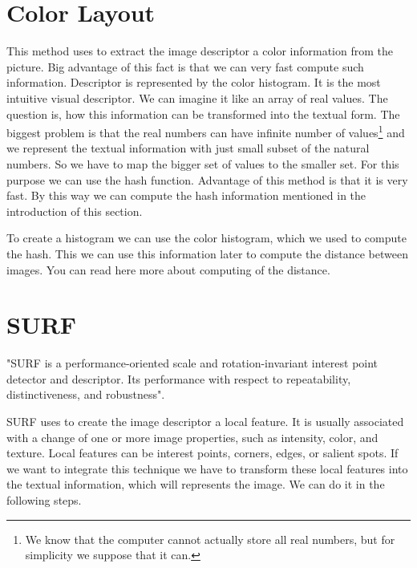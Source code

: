 \documentclass[12pt,a4paper]{report}
\begin{document}
\section{Color Layout}

This method uses to extract the image descriptor a color information from the picture. Big advantage of this fact is that we can very fast compute such information. Descriptor is represented by the color histogram. It is the most intuitive visual descriptor. We can imagine it like an array of real values. The question is, how this information can be transformed into the textual form. The biggest problem is that the real numbers can have infinite number of values\footnote{We know that the computer cannot actually store all real numbers, but for simplicity we suppose that it can.} and we represent the textual information with just small subset of the natural numbers. So we have to map the bigger set of values to the smaller set. For this purpose we can use the hash function. Advantage of this method is that it is very fast. By this way we can compute the hash information mentioned in the introduction of this section.

To create a histogram we can use the color histogram, which we used to compute the hash. This we can use this information later to compute the distance between images. You can read here\cite{ColorLayout} more about computing of the distance.

\section{SURF}

"SURF is a performance-oriented scale and rotation-invariant interest point detector and descriptor.
Its performance with respect to repeatability, distinctiveness, and robustness"\cite[s.~42]{VIRbook}.

SURF uses to create the image descriptor a local feature. It is usually associated with a change of one or more image properties, such as intensity, color, and texture. Local features can be interest points, corners, edges, or salient spots. If we want to integrate this technique we have to transform these local features into the textual information, which will represents the image. We can do it in the following steps.
\end{document}
